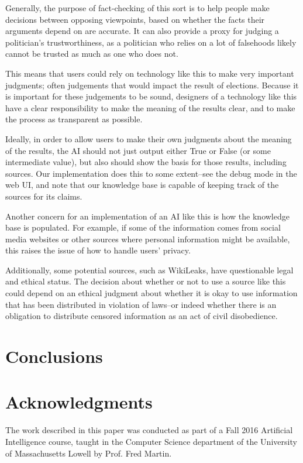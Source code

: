 \documentclass{chi2009}
\begin{document}
Generally, the purpose of fact-checking of this sort is to help people make decisions between opposing viewpoints, based on whether the facts their arguments depend on are accurate.
It can also provide a proxy for judging a politician's trustworthiness, as a politician who relies on a lot of falsehoods likely cannot be trusted as much as one who does not.

This means that users could rely on technology like this to make very important judgments; often judgements that would impact the result of elections.
Because it is important for these judgements to be sound, designers of a technology like this have a clear responsibility to make the meaning of the results clear, and to make the process as transparent as possible.

Ideally, in order to allow users to make their own judgments about the meaning of the results, the AI should not just output either True or False (or some intermediate value), but also should show the basis for those results, including sources.
Our implementation does this to some extent--see the debug mode in the web UI, and note that our knowledge base is capable of keeping track of the sources for its claims.

Another concern for an implementation of an AI like this is how the knowledge base is populated.
For example, if some of the information comes from social media websites or other sources where personal information might be available, this raises the issue of how to handle users' privacy.

Additionally, some potential sources, such as WikiLeaks, have questionable legal and ethical status.
The decision about whether or not to use a source like this could depend on an ethical judgment about whether it is okay to use information that has been distributed in violation of laws--or indeed whether there is an obligation to distribute censored information as an act of civil disobedience.

\section{Conclusions}


\section{Acknowledgments}

The work described in this paper was conducted as part of a Fall 2016 Artificial Intelligence course, taught in the Computer Science department of the University of Massachusetts Lowell by Prof. Fred Martin.



\end{document}

